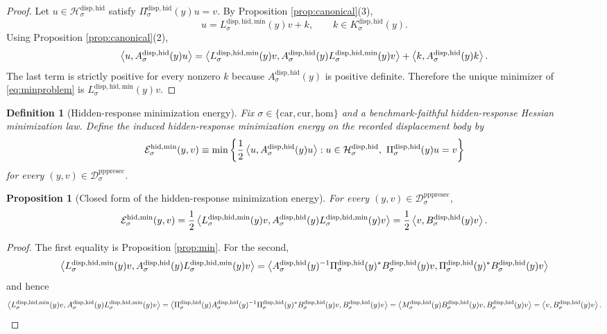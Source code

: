 \documentclass[11pt]{article}
\newcommand{\Car}{\mathrm{car}}
\newcommand{\Cur}{\mathrm{cur}}
\newcommand{\Hom}{\mathrm{hom}}
\newcommand{\PrePreProtoSectionResidualBody}[1]{\mathcal D_{#1}^{\mathrm{pppresec}}}
\newcommand{\HiddenCarrier}[1]{\mathcal H_{#1}^{\mathrm{disp,hid}}}
\newcommand{\HiddenReadout}[1]{\Pi_{#1}^{\mathrm{disp,hid}}}
\newcommand{\HiddenHessian}[1]{A_{#1}^{\mathrm{disp,hid}}}
\newcommand{\HiddenKernel}[1]{K_{#1}^{\mathrm{disp,hid}}}
\newcommand{\ReducedSchur}[1]{M_{#1}^{\mathrm{disp,hid}}}
\newcommand{\ReducedCoreOperator}[1]{B_{#1}^{\mathrm{disp,hid}}}
\newcommand{\HiddenMinLift}[1]{L_{#1}^{\mathrm{disp,hid,min}}}
\newtheorem{definition}{Definition}
\newtheorem{proposition}{Proposition}
\begin{document}
\begin{proof}
Let \(u\in\HiddenCarrier{\sigma}\) satisfy \(\HiddenReadout{\sigma}(y)u=v\). By Proposition \ref{prop:canonical}(3),
\[
u=\HiddenMinLift{\sigma}(y)v+k,
\qquad
k\in\HiddenKernel{\sigma}(y).
\]
Using Proposition \ref{prop:canonical}(2),
\[
\ev{u,\HiddenHessian{\sigma}(y)u}
=
\ev{
\HiddenMinLift{\sigma}(y)v,
\HiddenHessian{\sigma}(y)\HiddenMinLift{\sigma}(y)v
}
+
\ev{k,\HiddenHessian{\sigma}(y)k}.
\]
The last term is strictly positive for every nonzero \(k\) because \(\HiddenHessian{\sigma}(y)\) is positive definite. Therefore the unique minimizer of \eqref{eq:minproblem} is \(\HiddenMinLift{\sigma}(y)v\).
\end{proof}

\begin{definition}[Hidden-response minimization energy]
\label{def:energy}
Fix \(\sigma\in\{\Car,\Cur,\Hom\}\) and a benchmark-faithful hidden-response Hessian minimization law. Define the induced hidden-response minimization energy on the recorded displacement body by
\begin{equation}
\mathcal E_{\sigma}^{\mathrm{hid,min}}(y,v)
\equiv
\min\left\{
\frac{1}{2}\ev{u,\HiddenHessian{\sigma}(y)u}:
u\in\HiddenCarrier{\sigma},
\ \HiddenReadout{\sigma}(y)u=v
\right\}
\label{eq:energy}
\end{equation}
for every \((y,v)\in\PrePreProtoSectionResidualBody{\sigma}\).
\end{definition}

\begin{proposition}[Closed form of the hidden-response minimization energy]
\label{prop:energy}
For every \((y,v)\in\PrePreProtoSectionResidualBody{\sigma}\),
\begin{equation}
\mathcal E_{\sigma}^{\mathrm{hid,min}}(y,v)
=
\frac{1}{2}
\ev{
\HiddenMinLift{\sigma}(y)v,
\HiddenHessian{\sigma}(y)\HiddenMinLift{\sigma}(y)v
}
=
\frac{1}{2}
\ev{
v,\ReducedCoreOperator{\sigma}(y)v
}.
\label{eq:energyclosed}
\end{equation}
\end{proposition}

\begin{proof}
The first equality is Proposition \ref{prop:min}. For the second,
\[
\ev{
\HiddenMinLift{\sigma}(y)v,
\HiddenHessian{\sigma}(y)\HiddenMinLift{\sigma}(y)v
}
=
\ev{
\HiddenHessian{\sigma}(y)^{-1}\HiddenReadout{\sigma}(y)^*\ReducedCoreOperator{\sigma}(y)v,
\HiddenReadout{\sigma}(y)^*\ReducedCoreOperator{\sigma}(y)v
}
\]
and hence
\[
\ev{
\HiddenMinLift{\sigma}(y)v,
\HiddenHessian{\sigma}(y)\HiddenMinLift{\sigma}(y)v
}
=
\ev{
\HiddenReadout{\sigma}(y)\HiddenHessian{\sigma}(y)^{-1}\HiddenReadout{\sigma}(y)^*
\ReducedCoreOperator{\sigma}(y)v,
\ReducedCoreOperator{\sigma}(y)v
}
=
\ev{
\ReducedSchur{\sigma}(y)\ReducedCoreOperator{\sigma}(y)v,
\ReducedCoreOperator{\sigma}(y)v
}
=
\ev{
v,\ReducedCoreOperator{\sigma}(y)v
}.
\]
\end{proof}
\end{document}

